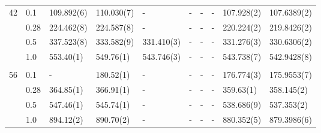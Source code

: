 {\begin{landscape}
\begin{table}
\begin{tabularx}{\hsize}{llR{2.3cm}R{2.3cm}R{2.3cm}R{2.3cm}R{2.3cm}R{2.3cm}R{2.3cm}R{2.3cm}}
		42 & 0.1 & 109.892(6) & 110.030(7) & - & - & - & - &  107.928(2) & 107.6389(2) \\ 
		& 0.28 & 224.462(8) & 224.587(8) & - & - & - & - & 220.224(2) & 219.8426(2) \\
		& 0.5 & 337.523(8) & 333.582(9) & 331.410(3) & - & - & - & 331.276(3) & 330.6306(2) \\
		& 1.0 & 553.40(1) & 549.76(1) & 543.746(3) & - & - & - & 543.738(7) & 542.9428(8) \\ \hdashline \\
		
		56 & 0.1 & - & 180.52(1) & - & - & - & - & 176.774(3) & 175.9553(7) \\ 
		& 0.28 & 364.85(1) & 366.91(1) & - & - & - & - & 359.63(1) & 358.145(2) \\
		& 0.5 & 547.46(1) & 545.74(1) & - & - & - & - & 538.686(9) & 537.353(2) \\
		& 1.0 & 894.12(2) & 890.70(2) & - & - & - & - & 880.352(5) & 879.3986(6) \\ \hline\hline
	\end{tabularx}
\end{table}


\end{landscape}}
